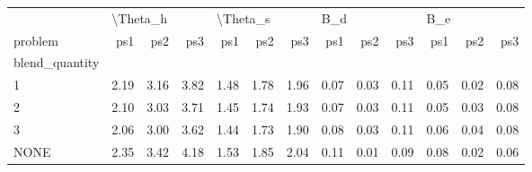 \begin{tabular}{lrrrrrrrrrrrr}
\toprule
{} & \multicolumn{3}{l}{\textbackslash Theta\_h} & \multicolumn{3}{l}{\textbackslash Theta\_s} & \multicolumn{3}{l}{B\_d} & \multicolumn{3}{l}{B\_e} \\
problem &      ps1 &  ps2 &  ps3 &      ps1 &  ps2 &  ps3 &  ps1 &  ps2 &  ps3 &  ps1 &  ps2 &  ps3 \\
blend\_quantity &          &      &      &          &      &      &      &      &      &      &      &      \\
\midrule
1              &     2.19 & 3.16 & 3.82 &     1.48 & 1.78 & 1.96 & 0.07 & 0.03 & 0.11 & 0.05 & 0.02 & 0.08 \\
2              &     2.10 & 3.03 & 3.71 &     1.45 & 1.74 & 1.93 & 0.07 & 0.03 & 0.11 & 0.05 & 0.03 & 0.08 \\
3              &     2.06 & 3.00 & 3.62 &     1.44 & 1.73 & 1.90 & 0.08 & 0.03 & 0.11 & 0.06 & 0.04 & 0.08 \\
NONE           &     2.35 & 3.42 & 4.18 &     1.53 & 1.85 & 2.04 & 0.11 & 0.01 & 0.09 & 0.08 & 0.02 & 0.06 \\
\bottomrule
\end{tabular}
